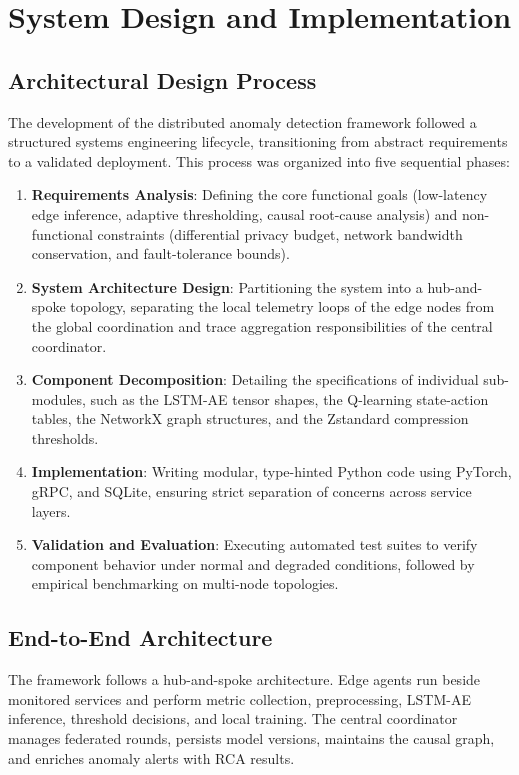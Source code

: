 \chapter{System Design and Implementation}
\label{ch:system_design}
\label{ch:reliability}

\section{Architectural Design Process}
\label{sec:design_process}

The development of the distributed anomaly detection framework followed a structured systems engineering lifecycle, transitioning from abstract requirements to a validated deployment. This process was organized into five sequential phases:
\begin{enumerate}
    \item \textbf{Requirements Analysis}: Defining the core functional goals (low-latency edge inference, adaptive thresholding, causal root-cause analysis) and non-functional constraints (differential privacy budget, network bandwidth conservation, and fault-tolerance bounds).
    \item \textbf{System Architecture Design}: Partitioning the system into a hub-and-spoke topology, separating the local telemetry loops of the edge nodes from the global coordination and trace aggregation responsibilities of the central coordinator.
    \item \textbf{Component Decomposition}: Detailing the specifications of individual sub-modules, such as the LSTM-AE tensor shapes, the Q-learning state-action tables, the NetworkX graph structures, and the Zstandard compression thresholds.
    \item \textbf{Implementation}: Writing modular, type-hinted Python code using PyTorch, gRPC, and SQLite, ensuring strict separation of concerns across service layers.
    \item \textbf{Validation and Evaluation}: Executing automated test suites to verify component behavior under normal and degraded conditions, followed by empirical benchmarking on multi-node topologies.
\end{enumerate}

\section{End-to-End Architecture}
\label{sec:design_architecture}

The framework follows a hub-and-spoke architecture. Edge agents run beside
monitored services and perform metric collection, preprocessing, LSTM-AE
inference, threshold decisions, and local training. The central coordinator
manages federated rounds, persists model versions, maintains the causal graph,
and enriches anomaly alerts with RCA results.

